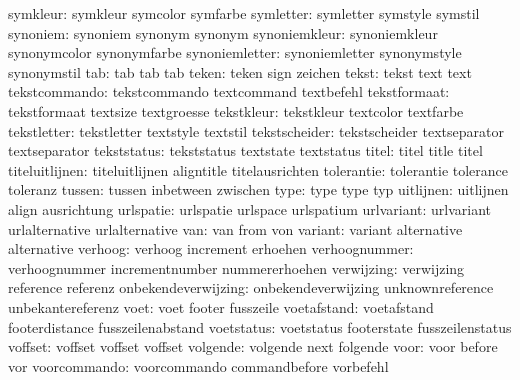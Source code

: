             symkleur:  symkleur             symcolor             symfarbe
           symletter:  symletter            symstyle             symstil
            synoniem:  synoniem             synonym              synonym
       synoniemkleur:  synoniemkleur        synonymcolor         synonymfarbe
      synoniemletter:  synoniemletter       synonymstyle         synonymstil
                 tab:  tab                  tab                  tab
               teken:  teken                sign                 zeichen
               tekst:  tekst                text                 text
       tekstcommando:  tekstcommando        textcommand          textbefehl
        tekstformaat:  tekstformaat         textsize             textgroesse
          tekstkleur:  tekstkleur           textcolor            textfarbe
         tekstletter:  tekstletter          textstyle            textstil
       tekstscheider:  tekstscheider        textseparator        textseparator
         tekststatus:  tekststatus          textstate            textstatus
               titel:  titel                title                titel
      titeluitlijnen:  titeluitlijnen       aligntitle           titelausrichten
          tolerantie:  tolerantie           tolerance            toleranz
              tussen:  tussen               inbetween            zwischen
                type:  type                 type                 typ
           uitlijnen:  uitlijnen            align                ausrichtung
           urlspatie:  urlspatie            urlspace             urlspatium
          urlvariant:  urlvariant           urlalternative       urlalternative
                 van:  van                  from                 von
             variant:  variant              alternative          alternative
             verhoog:  verhoog              increment            erhoehen
       verhoognummer:  verhoognummer        incrementnumber      nummererhoehen
          verwijzing:  verwijzing           reference            referenz
 onbekendeverwijzing:  onbekendeverwijzing  unknownreference     unbekantereferenz
                voet:  voet                 footer               fusszeile
         voetafstand:  voetafstand          footerdistance       fusszeilenabstand
          voetstatus:  voetstatus           footerstate          fusszeilenstatus
             voffset:  voffset              voffset              voffset
            volgende:  volgende             next                 folgende
                voor:  voor                 before               vor
        voorcommando:  voorcommando         commandbefore        vorbefehl
